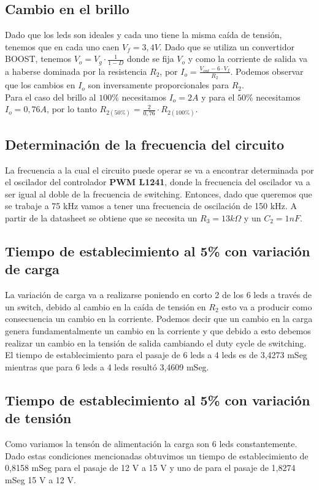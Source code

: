 \documentclass[e4-tp2-main.tex]{subfiles}
\begin{document}
\subsection{Cambio en el brillo}

Dado que los leds son ideales y cada uno tiene la misma caída de tensión, tenemos que en cada uno caen $V_f=3,4V$. Dado que se utiliza un convertidor BOOST, tenemos $V_o=V_g\cdot\frac{1}{1-D}$ donde se fija $V_o$ y como la corriente de salida va a haberse dominada por la resistencia $R_2$, por $I_o=\frac{V_{out}-6\cdot V_f}{R_2}$. Podemos observar que los cambios en $I_o$ son inversamente proporcionales para $R_2$.\\
Para el caso del brillo al $100\%$ necesitamos $I_o=2A$ y para el $50\%$ necesitamos $I_o=0,76 A$, por lo tanto $R_{2(50\%)}=\frac{2}{0,76}\cdot R_{2(100\%)}$.\\

\subsection{Determinación de la frecuencia del circuito}

La frecuencia a la cual el circuito puede operar se va a encontrar determinada por el oscilador del controlador \textbf{PWM L1241}, donde la frecuencia del oscilador va a ser igual al doble de la frecuencia de switching. Entonces, dado que queremos que se trabaje a 75 kHz vamos a tener una frecuencia de oscilación de 150 kHz. A partir de la datasheet se obtiene que se necesita un $R_3=13 k\Omega$ y un $C_2=1 nF$.\\

\subsection{Tiempo de establecimiento al 5\% con variación de carga}
La variación de carga va a realizarse poniendo en corto 2 de los 6 leds a través de un switch, debido al cambio en la caída de tensión en $R_2$ esto va a producir como consecuencia un cambio en la corriente. Podemos decir que un cambio en la carga genera fundamentalmente un cambio en la corriente y que debido a esto debemos realizar un cambio en la tensión de salida cambiando el duty cycle de switching.\\
El tiempo de establecimiento para el pasaje de 6 leds a 4 leds es de 3,4273 mSeg mientras que para 6 leds a 4 leds resultó 3,4609 mSeg.\\

\subsection{Tiempo de establecimiento al 5\% con variación de tensión}
Como variamos la tensón de alimentación la carga son 6 leds constantemente. Dado estas condiciones mencionadas obtuvimos un tiempo de establecimiento de 0,8158 mSeg para el pasaje de 12 V a 15 V y uno de  para el pasaje de 1,8274 mSeg 15 V a 12 V.\\
\end{document}
